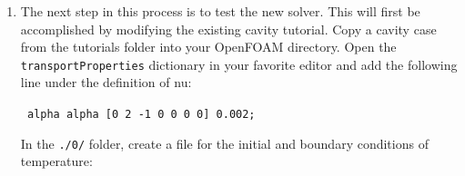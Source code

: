 \documentclass{article}
\newcommand\tab[1][0.5cm]{\hspace*{#1}}
\begin{document}
\begin{enumerate}[2.1]
\begin{myframe}
{		\tab\tab\tab \#include "continuityErrs.H" \\
		\\
		\tab\tab\tab U -= rUA*fvc::grad(p);\\
		\tab\tab\tab U.correctBoundaryConditions();\\
		\tab\tab \}\\
		\\
		\tab\tab //add these lines...\\
		\tab\tab fvScalarMatrix TEqn\\
		\tab\tab (\\
		\tab\tab\tab fvm::ddt(T)\\
		\tab\tab\tab + fvm::div(phi, T)\\
		\tab\tab\tab - fvm::laplacian(alpha, T)\\
		\tab\tab);\\
		\\
		\tab\tab TEqn.solve();\\
		\tab\tab //done adding lines...\\
		\\
		\tab\tab runTime.write();\\
	}
	\end{myframe}
	
	These lines add a new equation for the temperature and make use of the face flux variable, phi, which is already used in the momentum equation solution.
	
	Save your changes and run wmake to compile the solver: 
		
	{\tt \tab \$ wmake}
	
	
	
	\item The next step in this process is to test the new solver. This will first be accomplished by modifying the existing cavity tutorial. Copy a cavity case from the tutorials folder into your OpenFOAM directory. Open the {\tt transportProperties} dictionary in your favorite editor and add the following line under the definition of nu: 
	
	\begin{myframe}
	{\tt %
	alpha \tab \tab \tab alpha [0 2 -1 0 0 0 0] 0.002;
	}
	\end{myframe}
	
	
	In the {\tt ./0/} folder, create a file for the initial and boundary conditions of temperature:
	
	\begin{myframe}
	{\tt %

}
\end{myframe}
\end{enumerate}
\end{document}
